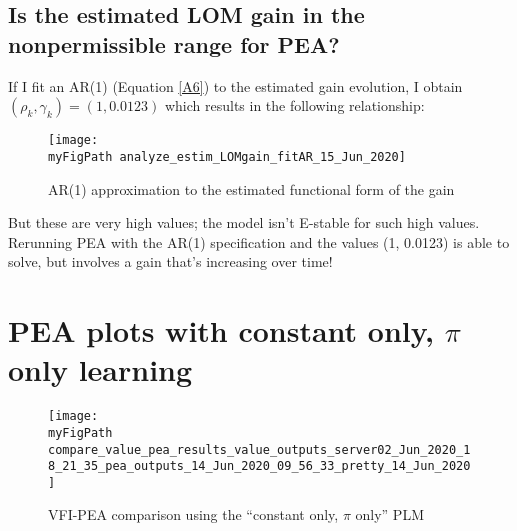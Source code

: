 \documentclass[11pt]{article}
\def \myFigPath {../../figures/}
\renewcommand{\[}{\begin{equation}}
\renewcommand{\]}{\end{equation}}
\begin{document}
\begin{enumerate}
\section{Is the estimated LOM gain in the nonpermissible range for PEA?}
If I fit an AR(1) (Equation \ref{A6}) to the estimated gain evolution, I obtain $(\rho_k, \gamma_k)=(1, 0.0123)$ which results in the following relationship:
\begin{figure}[h!]
\texttt{[image: \\myFigPath analyze\_estim\_LOMgain\_fitAR\_15\_Jun\_2020]}
\caption{AR(1) approximation to the estimated functional form of the gain}
\label{fitAR1}
\end{figure}

But these are very high values; the model isn't E-stable for such high values. Rerunning PEA with the AR(1) specification and the values (1, 0.0123) is able to solve, but involves a gain that's increasing over time!

\end{enumerate}

\clearpage
\section{PEA plots with constant only, $\pi$ only learning}
\begin{figure}[h!]
\hfill %
\hfill
{}
\caption{}
\label{updated_PEA_constant_only_pi_only}
\end{figure}

\begin{figure}[h!]
\texttt{[image: \\myFigPath compare\_value\_pea\_results\_value\_outputs\_server02\_Jun\_2020\_18\_21\_35\_pea\_outputs\_14\_Jun\_2020\_09\_56\_33\_pretty\_14\_Jun\_2020]}
\caption{VFI-PEA comparison using the ``constant only, $\pi$ only'' PLM}
\label{updated_PEA_VFI_comparison_constant_only_pi_only}
\end{figure}
\end{document}
